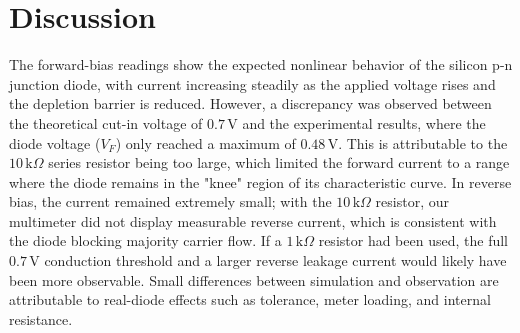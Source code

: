 \section{Discussion}

The forward-bias readings show the expected nonlinear behavior of the silicon p-n
junction diode, with current increasing steadily as the applied voltage rises and the
depletion barrier is reduced. However, a discrepancy was observed between the
theoretical cut-in voltage of $0.7\,\text{V}$ and the experimental results, where
the diode voltage ($V_F$) only reached a maximum of $0.48\,\text{V}$. This is
attributable to the $10\,\text{k}\Omega$ series resistor being too large, which
limited the forward current to a range where the diode remains in the "knee"
region of its characteristic curve. In reverse bias, the current remained
extremely small; with the $10\,\text{k}\Omega$ resistor, our multimeter did not
display measurable reverse current, which is consistent with the diode blocking
majority carrier flow. If a $1\,\text{k}\Omega$ resistor had been used, the
full $0.7\,\text{V}$ conduction threshold and a larger reverse leakage current
would likely have been more observable. Small differences between simulation
and observation are attributable to real-diode effects such as tolerance, meter
loading, and internal resistance.
